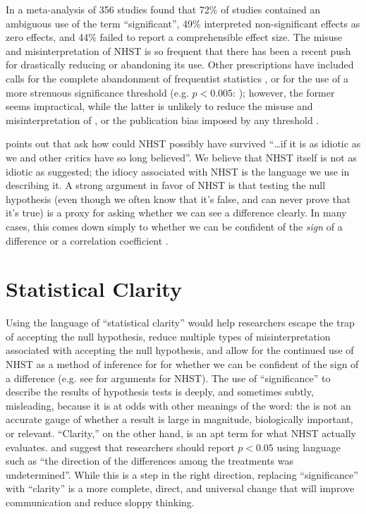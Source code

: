 In a meta-analysis of 356 studies \citet{Bernardietal.2017} found that 72\% of studies contained an ambiguous use of the term ``significant'', 49\% interpreted non-significant effects as zero effects, and 44\% failed to report a comprehensible effect size. The misuse and misinterpretation of NHST is so frequent that there has been a recent push for drastically reducing \citep{SzucsandIoannidis2017} or abandoning \citep{McShaneetal.2017} its use. Other prescriptions have included calls for the complete abandonment of frequentist statistics , or for the use of a more strenuous significance threshold (e.g. $p < 0.005$: \citealt{Benjaminetal.2018}); however, the former seems impractical, while the latter is unlikely to reduce the misuse and misinterpretation of \pvals, or the publication bias imposed by any \pval threshold \citep{Ridleyetal.2007}.

\citet{Kramer2011} points out that \citep{ZiliakandMcCloskey2008} ask how could NHST possibly have survived ``\ldots if it is as idiotic as we and other critics have so long believed''. We believe that NHST itself is not as idiotic as suggested; the idiocy associated with NHST is the language we use in describing it. A strong argument in favor of NHST is that testing the null hypothesis (even though we often know that it's false, and can never prove that it's true) is a proxy for asking whether we can see a difference clearly. In many cases, this comes down simply to whether we can be confident of the \emph{sign} of a difference or a correlation coefficient \cite{robinson2001past}. 

\section*{Statistical Clarity}

Using the language of ``statistical clarity'' would help researchers escape the trap of accepting the null hypothesis, reduce multiple types of misinterpretation associated with accepting the null hypothesis, and allow for the continued use of NHST as a method of inference for for whether we can be confident of the sign of a difference (e.g. see \citealt{Abelson1997} for arguments for NHST). The use of ``significance'' to describe the results of hypothesis tests is deeply, and sometimes subtly, misleading, because it is at odds with other meanings of the word: the \pval is not an accurate gauge of whether a result is large in magnitude, biologically important, or relevant. ``Clarity,'' on the other hand, is an apt term for what NHST actually evaluates. \citet{jones2000sensible} and \citet{robinson2001past} suggest that researchers should report $p < 0.05$ using language such as ``the direction of the differences among the treatments was undetermined''. While this is a step in the right direction, replacing ``significance'' with ``clarity'' is a more complete, direct, and universal change that will improve communication and reduce sloppy thinking.

